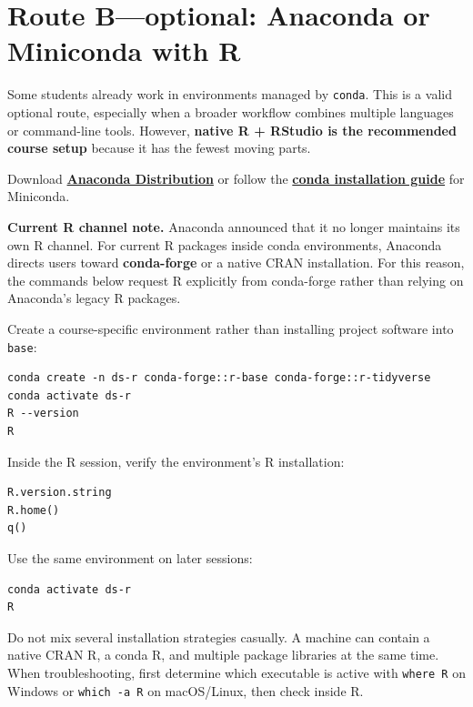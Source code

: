 \section{Route B---optional: Anaconda or Miniconda with R}

Some students already work in environments managed by \texttt{conda}. This is a valid optional route, especially when a broader workflow combines multiple languages or command-line tools. However, \textbf{native R + RStudio is the recommended course setup} because it has the fewest moving parts.

Download \href{https://www.anaconda.com/download}{\textbf{Anaconda Distribution}} or follow the \href{https://docs.conda.io/projects/conda/en/stable/user-guide/install/}{\textbf{conda installation guide}} for Miniconda.

\begin{referencebox}
\textbf{Current R channel note.} Anaconda announced that it no longer maintains its own R channel. For current R packages inside conda environments, Anaconda directs users toward \textbf{conda-forge} or a native CRAN installation. For this reason, the commands below request R explicitly from conda-forge rather than relying on Anaconda's legacy R packages.
\end{referencebox}

Create a course-specific environment rather than installing project software into \texttt{base}:

\begin{lstlisting}[style=utpterminal]
conda create -n ds-r conda-forge::r-base conda-forge::r-tidyverse
conda activate ds-r
R --version
R
\end{lstlisting}

Inside the R session, verify the environment's R installation:

\begin{lstlisting}[style=utpr]
R.version.string
R.home()
q()
\end{lstlisting}

Use the same environment on later sessions:

\begin{lstlisting}[style=utpterminal]
conda activate ds-r
R
\end{lstlisting}

\begin{pitfall}
Do not mix several installation strategies casually. A machine can contain a native CRAN R, a conda R, and multiple package libraries at the same time. When troubleshooting, first determine which executable is active with \texttt{where R} on Windows or \texttt{which -a R} on macOS/Linux, then check  inside R.
\end{pitfall}

